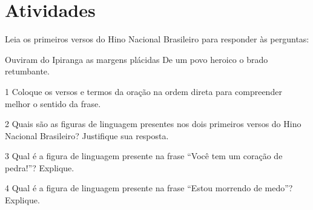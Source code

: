
\section*{Atividades}

Leia os primeiros versos do Hino Nacional Brasileiro para responder às perguntas:

\begin{myquote} 

Ouviram do Ipiranga as margens plácidas
De um povo heroico o brado retumbante.


\end{myquote}


\num{1} Coloque os versos e termos da oração na ordem direta para compreender 
melhor o sentido da frase. 


\num{2} Quais são as figuras de linguagem presentes nos dois primeiros versos do 
Hino Nacional Brasileiro? Justifique sua resposta.


\num{3} Qual é a figura de linguagem presente na frase ``Você tem um coração de pedra!''? 
Explique.


\num{4} Qual é a figura de linguagem presente na frase  ``Estou morrendo de medo''? Explique.


